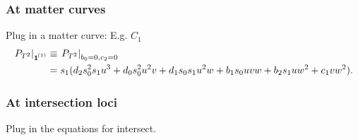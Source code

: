 \documentclass[11pt,a4paper,english]{scrartcl}
\newcommand\mc[1]{{\vphantom{\bar{\boldsymbol{1}}}\boldsymbol{1}}^{\mkern-2mu (#1)}}
\begin{document}
\subsubsection{At matter curves}
Plug in a matter curve: E.g.  $C_1$
\begin{align*}
\label{eqmattercurve}
\left. P_{T^2} \right|_{\mc{1}} &\equiv \left. P_{T^2} \right|_{b_0 =0, c_2=0}  \\
&=  s_1 (d_2 s_0^2 s_1 u^3 + d_0 s_0^2 u^2 v +  d_1 s_0 s_1 u^2 w + b_1 s_0 u v w + b_2 s_1 u w^2 + c_1 v w^2).
\end{align*}

\subsubsection{At intersection loci}
Plug in the equations for intersect.
\end{document}
